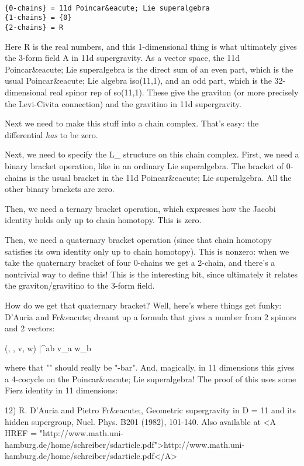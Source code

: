 \begin{verbatim}

{0-chains} = 11d Poincar&eacute; Lie superalgebra
{1-chains} = {0}
{2-chains} = R
\end{verbatim}
    

Here R is the real numbers, and this 1-dimensional thing is 
what ultimately gives the 3-form field A in 11d supergravity.   
As a vector space, the 11d Poincar&eacute; Lie superalgebra is the 
direct sum of an even part, which is the usual Poincar&eacute; Lie 
algebra iso(11,1), and an odd part, which is the 32-dimensional 
real spinor rep of so(11,1).  These give the graviton (or
more precisely the Levi-Civita connection) and the gravitino
in 11d supergravity.  

Next we need to make this stuff into a chain complex.  That's
easy: the differential \emph{has} to be zero.

Next, we need to specify the L_{\infty } structure on this
chain complex.  First, we need a binary bracket operation, 
like in an ordinary Lie superalgebra.
The bracket of 0-chains is the usual bracket in the 11d Poincar&eacute; 
Lie superalgebra.  All the other binary brackets are zero.

Then, we need a ternary bracket operation, which expresses how the
Jacobi identity holds only up to chain homotopy.  This is zero.

Then, we need a quaternary bracket operation (since that
chain homotopy satisfies its own identity only up to chain
homotopy).  This is nonzero: when we take the quaternary
bracket of four 0-chains we get a 2-chain, and there's a
nontrivial way to define this!  This is the interesting bit,
since ultimately it relates the graviton/gravitino to the 
3-form field.

How do we get that quaternary bracket?  Well, here's where
things get funky: D'Auria and Fr&eacute; dreamt up a formula that 
gives a number from 2 spinors and 2 vectors: 

(\psi , \phi , v, w) |\to  \psi * \Gamma ^{ab} \phi  v_{a} w_{b}

where that "\psi *" should really be "\psi -bar".
And, magically, in 11 dimensions this gives a 4-cocycle on 
the Poincar&eacute; Lie superalgebra!  The proof of this uses some
Fierz identity in 11 dimensions:

12) R. D'Auria and Pietro Fr&eacute;, Geometric supergravity in D = 11
and its hidden supergroup, Nucl. Phys. B201 (1982), 101-140.
Also available at <A HREF = "http://www.math.uni-hamburg.de/home/schreiber/sdarticle.pdf">http://www.math.uni-hamburg.de/home/schreiber/sdarticle.pdf</A>

